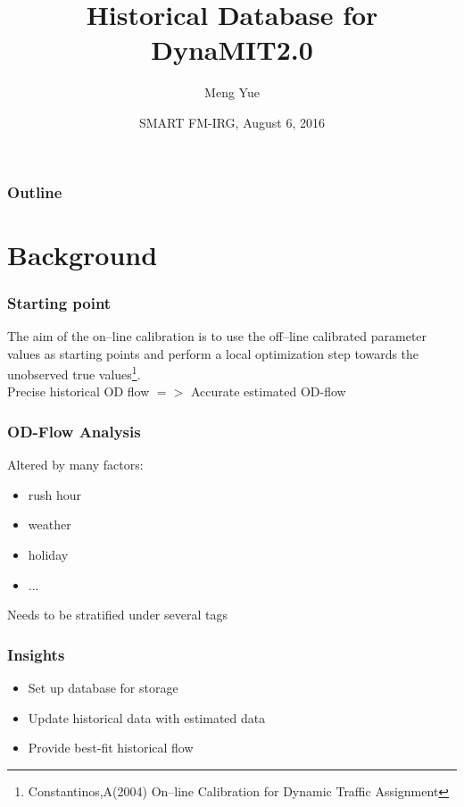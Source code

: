 \documentclass[12pt]{beamer}
\title[DynaMIT-Database Infrastructure]
{Historical Database for DynaMIT2.0}
\author{Meng Yue}
\institute[Dep.Automation,Tsinghua]
{Department of Automation,Tsinghua University, China}
\date[August 6, 2016]
{SMART FM-IRG, August 6, 2016}
\begin{document}
 

\frame{\titlepage}

\begin{frame}
\frametitle{Outline}
\tableofcontents
\end{frame}



\section{Background}

\begin{frame}
\frametitle{Starting point}
The aim of the on–line calibration is to use the off–line calibrated parameter
values as starting points and perform a local optimization step towards the unobserved true values\footnote{ Constantinos,A(2004) On–line Calibration for Dynamic Traffic Assignment}.\\ 
\vspace{0.5in}
Precise historical OD flow $=>$ Accurate estimated OD-flow \\

\end{frame}

\begin{frame}
\frametitle{OD-Flow Analysis}
Altered by many factors:
\begin{itemize}
\item rush hour
\item weather
\item holiday
\item ...
\end{itemize}
\vspace{0.5in}
Needs to be stratified under several tags
\end{frame}

\begin{frame}
\frametitle{Insights}
\begin{itemize}
\item Set up database for storage
\item Update historical data with estimated data
\item Provide best-fit historical flow
\end{itemize}
\end{frame}
\end{document}
